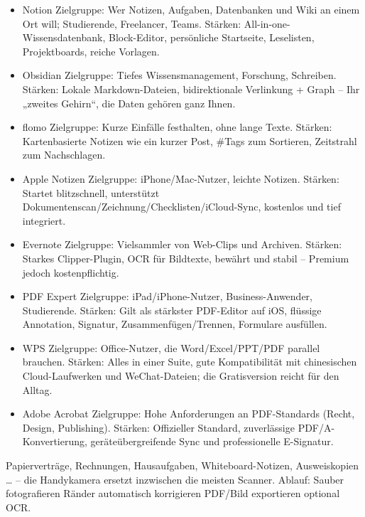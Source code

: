 \begin{itemize}
  \item Notion Zielgruppe: Wer Notizen, Aufgaben, Datenbanken und Wiki an einem Ort will; Studierende, Freelancer, Teams. Stärken: All-in-one-Wissensdatenbank, Block-Editor, persönliche Startseite, Leselisten, Projektboards, reiche Vorlagen.
  \item Obsidian Zielgruppe: Tiefes Wissensmanagement, Forschung, Schreiben. Stärken: Lokale Markdown-Dateien, bidirektionale Verlinkung + Graph – Ihr „zweites Gehirn“, die Daten gehören ganz Ihnen.
  \item flomo Zielgruppe: Kurze Einfälle festhalten, ohne lange Texte. Stärken: Kartenbasierte Notizen wie ein kurzer Post, \#Tags zum Sortieren, Zeitstrahl zum Nachschlagen.
  \item Apple Notizen Zielgruppe: iPhone/Mac-Nutzer, leichte Notizen. Stärken: Startet blitzschnell, unterstützt Dokumentenscan/Zeichnung/Checklisten/iCloud-Sync, kostenlos und tief integriert.
  \item Evernote Zielgruppe: Vielsammler von Web-Clips und Archiven. Stärken: Starkes Clipper-Plugin, OCR für Bildtexte, bewährt und stabil – Premium jedoch kostenpflichtig.
\end{itemize}


\begin{itemize}
  \item PDF Expert Zielgruppe: iPad/iPhone-Nutzer, Business-Anwender, Studierende. Stärken: Gilt als stärkster PDF-Editor auf iOS, flüssige Annotation, Signatur, Zusammenfügen/Trennen, Formulare ausfüllen.
  \item WPS Zielgruppe: Office-Nutzer, die Word/Excel/PPT/PDF parallel brauchen. Stärken: Alles in einer Suite, gute Kompatibilität mit chinesischen Cloud-Laufwerken und WeChat-Dateien; die Gratisversion reicht für den Alltag.
  \item Adobe Acrobat Zielgruppe: Hohe Anforderungen an PDF-Standards (Recht, Design, Publishing). Stärken: Offizieller Standard, zuverlässige PDF/A-Konvertierung, geräteübergreifende Sync und professionelle E-Signatur.
\end{itemize}


Papierverträge, Rechnungen, Hausaufgaben, Whiteboard-Notizen, Ausweiskopien … – die Handykamera ersetzt inzwischen die meisten Scanner. Ablauf: Sauber fotografieren Ränder automatisch korrigieren PDF/Bild exportieren optional OCR.

